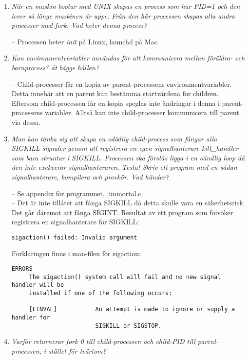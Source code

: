 \documentclass[paper=a4, fontsize=11pt]{scrartcl} %
\numberwithin{equation}{section} %
\numberwithin{figure}{section} %
\numberwithin{table}{section} %
\begin{document}
\begin{enumerate}[1)]
\item \emph{När en maskin bootar med UNIX skapas en process som har PID=1 och den lever så länge maskinen är uppe. Från den här processen skapas alla andra processer med fork. Vad heter denna process?}

-- Processen heter \emph{init} på Linux, launchd på Mac.

\item \emph{Kan environmentvariabler användas för att kommunicera mellan föräldra- och barnprocess? åt bägge hållen?}

-- Child-processer får en kopia av parent-processens environmentvariabler. Detta innebär att en parent kan bestämma startvärdena för children.
Eftersom child-processen får en kopia speglas inte ändringar i denna i parent-processens variabler. Alltså kan inte child-processer kommunicera till parent via dessa.

\item \emph{Man kan tänka sig att skapa en odödlig child-process som fångar alla SIGKILL-signaler genom att registrera en egen signalhanterare kill\_handler som bara struntar i SIGKILL. Processen ska förstås ligga i en oändlig loop då den inte exekverar signalhanteraren. Testa! Skriv ett program med en sådan signalhanterare, kompilera och provkör. Vad händer?}

-- Se appendix för programmet, |immortal.c| \\
-- Det är inte tillåtet att fånga SIGKILL då detta skulle vara en säkerhetsrisk. Det går däremot att fånga SIGINT.
Resultat av ett program som försöker registrera en signalhanterare för SIGKILL:

\begin{verbatim}
sigaction() failed: Invalid argument
\end{verbatim}

Förklaringen finns i man-filen för sigaction:
\begin{verbatim}
ERRORS
     The sigaction() system call will fail and no new signal handler will be
     installed if one of the following occurs:

     [EINVAL]           An attempt is made to ignore or supply a handler for
                        SIGKILL or SIGSTOP.
\end{verbatim}

\item \emph{Varför returnerar fork 0 till child-processen och child-PID till parent-processen, i stället för tvärtom?}



\end{enumerate}
\end{document}
